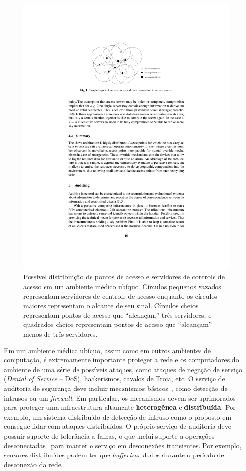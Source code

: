 \begin{figure}[htbp]
	\centering
		\includegraphics[width=.6\textwidth]{figuras/pervasive_hospital1.pdf}
	\caption{Possível distribuição de pontos de acesso e servidores de controle de acesso em um ambiente médico ubíquo. Círculos pequenos vazados representam servidores de controle de acesso enquanto os círculos maiores representam o alcance de seu sinal. Círculos cheios representam pontos de acesso que ``alcançam'' três servidores, e quadrados cheios representam pontos de acesso que ``alcançam'' menos de três servidores.}
	\label{fig:pervasive_hospital1}
\end{figure}

Em um ambiente médico ubíquo, assim como em outros ambientes de computação, é extremamente importante proteger a rede e os computadores do ambiente de uma série de possíveis ataques, como ataques de negação de serviço (\emph{Denial of Service} -- DoS), hackerismos, cavalos de Troia, etc. O serviço de auditoria de segurança deve incluir mecanismos básicos~\cite{lunt1988automated,tsudik1990audes}, como detecção de intrusos ou um \emph{firewall}. Em particular, os mecanismos devem ser aprimorados para proteger uma infraestrutura altamente \textbf{heterogênea} e \textbf{distribuída}. Por exemplo, um sistema distribuído de detecção de intruso como o proposto em~\cite{bass2000intrusion} consegue lidar com ataques distribuídos.
O próprio serviço de auditoria deve possuir suporte de tolerância a falhas, o que inclui suporte a operações desconectadas~\cite{kistler1992disconnected} para manter o serviço em desconexões transientes. Por exemplo, sensores distribuídos podem ter que \emph{bufferizar} dados durante o período de desconexão da rede.

